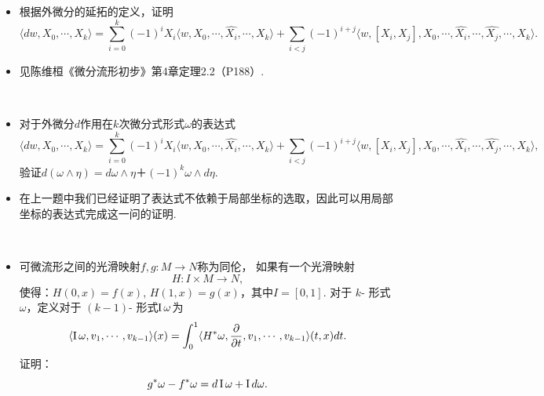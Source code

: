 \begin{itemize}
    ~\\
    \item[7.]
    根据外微分的延拓的定义，证明
    \[
    \langle dw,X_0,\cdots,X_k\rangle
    =\sum\limits_{i=0}^{k}(-1)^{i}X_i \langle w,X_0,\cdots,\hat{X_i},\cdots,X_k \rangle
    +\sum\limits_{i<j}(-1)^{i+j}\langle w,[X_i,X_j],X_0,\cdots,\hat{X_i},\cdots,\hat{X_j},\cdots,X_k\rangle.
    \]

    \item[\textit{Pf:}]
    见陈维桓《微分流形初步》第4章定理2.2（P188）.
    
    ~\\
    \item[8.]
    对于外微分$d$作用在$k$次微分式形式$\omega$的表达式
    \[
    \langle dw,X_0,\cdots,X_k\rangle
    =\sum\limits_{i=0}^k(-1)^{i}X_i \langle w,X_0,\cdots,\hat{X_i},\cdots,X_k \rangle
    +\sum\limits_{i<j}(-1)^{i+j}\langle w,[X_i,X_j],X_0,\cdots,\hat{X_i},\cdots,\hat{X_j},\cdots,X_k\rangle,
    \]
    验证$d(\omega\wedge\eta)=d\omega\wedge \eta＋(-1)^k\omega\wedge d\eta$.

    \item[\textit{Pf:}]
    在上一题中我们已经证明了表达式不依赖于局部坐标的选取，因此可以用局部坐标的表达式完成这一问的证明.
    
    ~\\
    \item[9.]
    可微流形之间的光滑映射$f,g\colon M\rightarrow N$称为同伦，
    如果有一个光滑映射$$H\colon I\times M\rightarrow N,$$
    使得：$H(0,x)=f(x)$, $H(1,x)=g(x)$，其中$I=[0,1]$. 
    对于 $k$- 形式$\omega$，定义对于 $(k-1)$- 形式$\operatorname{I}\omega$为
    \[
        \langle \operatorname{I}\omega,v_1,\cdots,v_{k-1}\rangle(x)=
        \int_0^1\langle H^*\omega,\frac{\partial}{\partial t},v_1,\cdots,v_{k-1}\rangle(t,x)dt.
    \]
    证明：
    $$g^*\omega-f^*\omega=d\operatorname{I}\omega+\operatorname{I} d\omega.$$


\end{itemize}
